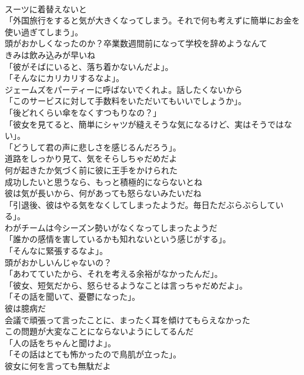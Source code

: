 \documentclass[8pt]{extreport}
\begin{document}
\begin{CJK}{UTF8}{min}
\\	スーツに着替えないと	
\\	「外国旅行をすると気が大きくなってしまう。それで何も考えずに簡単にお金を使い過ぎてしまう」。	
\\	頭がおかしくなったのか？卒業数週間前になって学校を辞めようなんて	
\\	きみは飲み込みが早いね	
\\	「彼がそばにいると、落ち着かないんだよ」。	
\\	「そんなにカリカリするなよ」。	
\\	ジェームズをパーティーに呼ばないでくれよ。話したくないから	
\\	「このサービスに対して手数料をいただいてもいいでしょうか」。	
\\	「後どれくらい傘をなくすつもりなの？」	
\\	「彼女を見てると、簡単にシャツが縫えそうな気になるけど、実はそうではない」。	
\\	「どうして君の声に悲しさを感じるんだろう」。	
\\	道路をしっかり見て、気をそらしちゃだめだよ	
\\	何が起きたか気づく前に彼に王手をかけられた	
\\	成功したいと思うなら、もっと積極的にならないとね	
\\	彼は気が長いから、何があっても怒らないみたいだね	
\\	「引退後、彼はやる気をなくしてしまったようだ。毎日ただぶらぶらしている」。	
\\	わがチームは今シーズン勢いがなくなってしまったようだ	
\\	「誰かの感情を害しているかも知れないという感じがする」。	
\\	「そんなに緊張するなよ」。	
\\	頭がおかしいんじゃないの？	
\\	「あわてていたから、それを考える余裕がなかったんだ」。	
\\	「彼女、短気だから、怒らせるようなことは言っちゃだめだよ」。	
\\	「その話を聞いて、憂鬱になった」。	
\\	彼は臆病だ	
\\	会議で頑張って言ったことに、まったく耳を傾けてもらえなかった	
\\	この問題が大変なことにならないようにしてるんだ	
\\	「人の話をちゃんと聞けよ」。	
\\	「その話はとても怖かったので鳥肌が立った」。	
\\	彼女に何を言っても無駄だよ	

\end{CJK}
\end{document}
